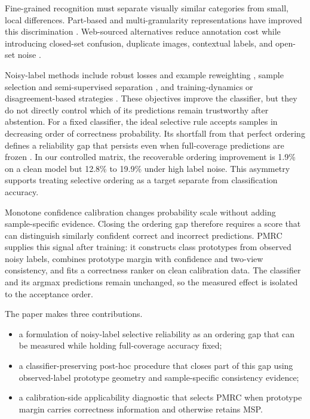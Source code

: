 \documentclass[review,times]{elsarticle}
\newcommand{\method}{PMRC}
\begin{document}
Fine-grained recognition must separate visually similar categories from small, local differences. Part-based and multi-granularity representations have improved this discrimination \citep{lin2015bilinear,du2020pmg}. Web-sourced alternatives reduce annotation cost while introducing closed-set confusion, duplicate images, contextual labels, and open-set noise \citep{wei2022cifar100n,sun2021webfg}.

Noisy-label methods include robust losses and example reweighting \citep{song2023noisysurvey,wang2019sce,ren2018reweight}, sample selection and semi-supervised separation \citep{han2018coteaching,li2020dividemix}, and training-dynamics or disagreement-based strategies \citep{ma2018dimensionality,yu2019disagreement}. These objectives improve the classifier, but they do not directly control which of its predictions remain trustworthy after abstention. For a fixed classifier, the ideal selective rule accepts samples in decreasing order of correctness probability. Its shortfall from that perfect ordering defines a reliability gap that persists even when full-coverage predictions are frozen \citep{geifman2017selective,rabanser2025selectivegap}. In our controlled matrix, the recoverable ordering improvement is 1.9\% on a clean model but 12.8\% to 19.9\% under high label noise. This asymmetry supports treating selective ordering as a target separate from classification accuracy.

Monotone confidence calibration changes probability scale without adding sample-specific evidence. Closing the ordering gap therefore requires a score that can distinguish similarly confident correct and incorrect predictions. \method{} supplies this signal after training: it constructs class prototypes from observed noisy labels, combines prototype margin with confidence and two-view consistency, and fits a correctness ranker on clean calibration data. The classifier and its argmax predictions remain unchanged, so the measured effect is isolated to the acceptance order.

The paper makes three contributions.
\begin{itemize}
  \item a formulation of noisy-label selective reliability as an ordering gap that can be measured while holding full-coverage accuracy fixed;
  \item a classifier-preserving post-hoc procedure that closes part of this gap using observed-label prototype geometry and sample-specific consistency evidence;
  \item a calibration-side applicability diagnostic that selects PMRC when prototype margin carries correctness information and otherwise retains MSP.
\end{itemize}
\end{document}
